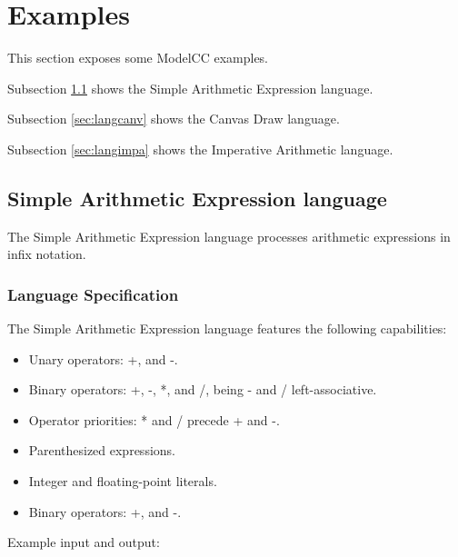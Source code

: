 \documentclass[a4paper,twoside,onecolumn]{article}
\begin{document}
\section{Examples} \label{sec:examples}

This section exposes some ModelCC examples.

Subsection \ref{sec:langsae} shows the Simple Arithmetic Expression language.

Subsection \ref{sec:langcanv} shows the Canvas Draw language.

Subsection \ref{sec:langimpa} shows the Imperative Arithmetic language.

\subsection{Simple Arithmetic Expression language} \label{sec:langsae}

The Simple Arithmetic Expression language processes arithmetic expressions in infix notation.

\subsubsection{Language Specification}
The Simple Arithmetic Expression language features the following capabilities:

\begin{itemize}
\item Unary operators: +, and -.
\item Binary operators: +, -, *, and /, being - and / left-associative.
\item Operator priorities: * and / precede + and -.
\item Parenthesized expressions.
\item Integer and floating-point literals.
\item Binary operators: +, and -.
\end{itemize}

Example input and output:  
\end{document}
